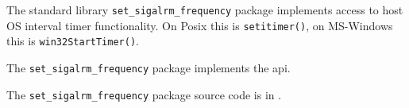 
The standard library {\tt set\_sigalrm\_frequency} package implements access to host 
OS interval timer functionality.  On Posix this is {\tt setitimer()}, 
on MS-Windows this is {\tt win32StartTimer()}.

The {\tt set\_sigalrm\_frequency} package implements the 
 api.

The {\tt set\_sigalrm\_frequency} package source code is in .


